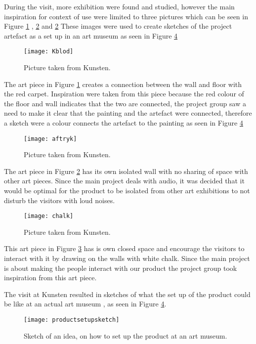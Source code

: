 During the visit, more exhibition were found and studied, however the main inspiration for context of use were limited to three pictures which can be seen in Figure \ref{Fig:Kblod} , \ref{Fig:aftryk} and \ref{Fig:aftryk} These images were used to create sketches of the project artefact as a set up in an art museum as seen in Figure \ref{Fig:productsetupsketch}

\begin{figure}[!h] 
\centering
\texttt{[image: Kblod]}
\caption{\label{Fig:Kblod} Picture taken from Kunsten.}
\end{figure}
The art piece in Figure \ref{Fig:Kblod} creates a connection between the wall and floor with the red carpet. Inspiration were taken from this piece because the red colour of the floor and wall indicates that the two are connected, the project group saw a need to make it clear that the painting and the artefact were connected, therefore a sketch were a colour connects the artefact to the painting as seen in Figure \ref{Fig:productsetupsketch}


\begin{figure}[!h] 
\centering
\texttt{[image: aftryk]}
\caption{\label{Fig:aftryk} Picture taken from Kunsten.}
\end{figure}
The art piece in Figure \ref{Fig:aftryk} has its own isolated wall with no sharing of space with other art pieces. Since the main project deals with audio, it was decided that it would be optimal for the product to be isolated from other art exhibitions to not disturb the visitors with loud noises.
 
 \begin{figure}[!h] 
\centering
\texttt{[image: chalk]}
\caption{\label{Fig:chalk} Picture taken from Kunsten.}
\end{figure}
This art piece in Figure \ref{Fig:chalk} has is own closed space and encourage the visitors to interact with it by drawing on the walls with white chalk. Since the main project is about making the people interact with our product  the project group took inspiration from this art piece. 

The visit at Kunsten resulted in sketches of what the set up of the product could be like at an actual art museum , as seen in Figure \ref{Fig:productsetupsketch}.
 
 \begin{figure}[!h] 
\centering
\texttt{[image: productsetupsketch]}
\caption{\label{Fig:productsetupsketch} Sketch of an idea, on how to set up the product at an art museum.}
\end{figure}
 
